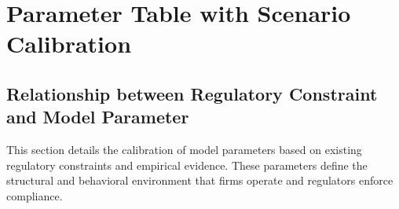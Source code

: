 \section{Parameter Table with Scenario Calibration}
 


\subsection*{Relationship between Regulatory Constraint and Model Parameter}

This section details the calibration of model parameters based on existing regulatory constraints and empirical evidence. These parameters define the structural and behavioral environment that firms operate and regulators enforce compliance. 

